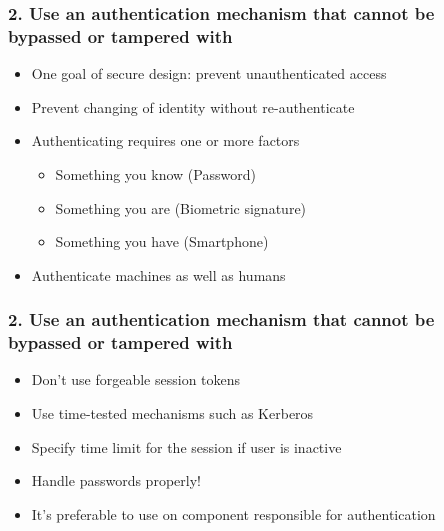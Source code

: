 \documentclass[12pt,norsk]{beamer}
\begin{document}
\begin{frame}

	\frametitle{2. Use an authentication mechanism that cannot be bypassed or tampered with}
	\begin{itemize}
	\item One goal of secure design: prevent unauthenticated access
	\item Prevent changing of identity without re-authenticate 
	\item Authenticating requires one or more factors	
	
		\begin{itemize}
			\item Something you know (Password)
			\item Something you are (Biometric signature)
			\item Something you have (Smartphone)
		\end{itemize}
		
	\item Authenticate machines as well as humans	
	
	\end{itemize}
	
	
	
\end{frame}

\begin{frame}

	\frametitle{2. Use an authentication mechanism that cannot be bypassed or tampered with}
	\begin{itemize}
	\item Don't use forgeable session tokens
	\item Use time-tested mechanisms such as Kerberos %
	\item Specify time limit for the session if user is inactive
	\item Handle passwords properly!
	\item It's preferable to use on component responsible for authentication
	\end{itemize}
	
\end{frame}
\end{document}
